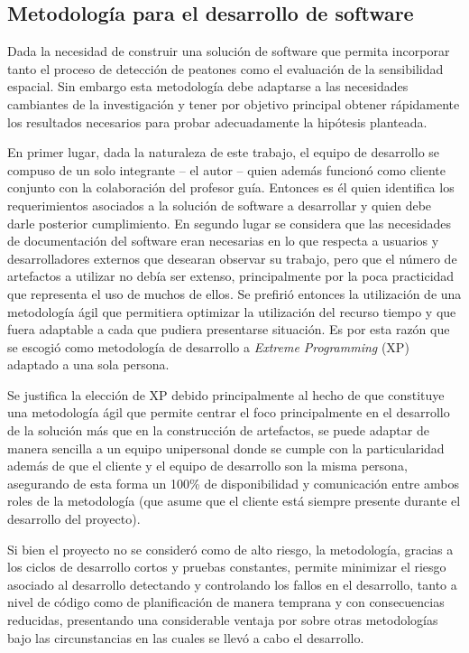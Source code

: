 \subsection{Metodolog\'ia para el desarrollo de software}


Dada la necesidad de construir una solución de software que permita incorporar tanto el proceso de detección de peatones como el  evaluación de la sensibilidad espacial. Sin embargo esta metodología debe adaptarse a las necesidades cambiantes de la investigación y tener por objetivo principal obtener rápidamente los resultados necesarios para probar adecuadamente la hipótesis planteada.

En primer lugar, dada la naturaleza de este trabajo, el equipo de desarrollo se compuso de un solo integrante – el autor – quien además funcionó como cliente conjunto con la colaboración del profesor guía. Entonces es él quien identifica los requerimientos asociados a la solución de software a desarrollar y quien debe darle posterior cumplimiento. En segundo lugar se considera que las necesidades de documentación del software eran necesarias en lo que respecta a usuarios y desarrolladores externos que desearan observar su trabajo, pero que el número de artefactos a utilizar no debía ser extenso, principalmente por la poca practicidad que representa el uso de muchos de ellos. Se prefirió entonces la utilización de una metodología ágil que permitiera optimizar la utilización del recurso tiempo y que fuera adaptable a cada que pudiera presentarse situación. Es por esta razón que se escogió como metodología de desarrollo a \textit{Extreme Programming} (XP) adaptado a una sola persona.

Se justifica la elección de XP debido principalmente al hecho de que constituye una metodología ágil que permite centrar el foco principalmente en el desarrollo de la solución más que en la construcción de artefactos, se puede adaptar de manera sencilla a un equipo unipersonal donde se cumple con la particularidad además de que el cliente y el equipo de desarrollo son la misma persona, asegurando de esta forma un 100\% de disponibilidad y comunicación entre ambos roles de la metodología (que asume que el cliente está siempre presente durante el desarrollo del proyecto).

Si bien el proyecto no se consideró como de alto riesgo, la metodología, gracias a los ciclos de desarrollo cortos y pruebas constantes, permite minimizar el riesgo asociado al desarrollo detectando y controlando los fallos en el desarrollo, tanto a nivel de código como de planificación de manera temprana y con consecuencias reducidas, presentando una considerable ventaja por sobre otras metodologías bajo las circunstancias en las cuales se llevó a cabo el desarrollo.

